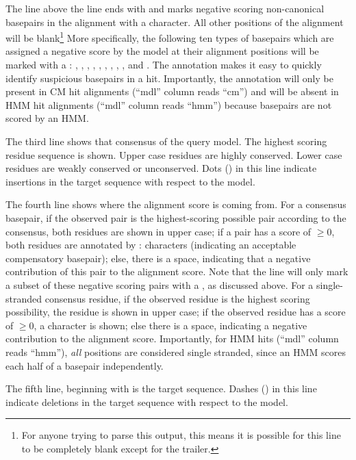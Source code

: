 The line above the  line ends with  and marks
negative scoring non-canonical basepairs in the alignment with a
 character. All other positions of the alignment will be
blank\footnote{For anyone trying to parse this output, this means it
is possible for this line to be completely blank except for the
 trailer.} More specifically, the following ten types of
basepairs which are assigned a negative score by the model at their
alignment positions will be marked with a : ,
, , , , ,
, , , and . The 
annotation makes it easy to quickly identify suspicious basepairs in
a hit. Importantly, the  annotation will only be present in
CM hit alignments (``mdl'' column reads ``cm'') and will be absent in
HMM hit alignments (``mdl'' column reads ``hmm'') because basepairs
are not scored by an HMM.

The third line shows that consensus of the query model. The highest
scoring residue sequence is shown. Upper case residues are highly
conserved. Lower case residues are weakly conserved or unconserved.
Dots () in this line indicate insertions in the target
sequence with respect to the model.

The fourth line shows where the alignment score is coming from. For a
consensus basepair, if the observed pair is the highest-scoring
possible pair according to the consensus, both residues are shown in
upper case; if a pair has a score of $\geq 0$, both residues are
annotated by : characters (indicating an acceptable compensatory
basepair); else, there is a space, indicating that a negative
contribution of this pair to the alignment score. Note that the 
 line will only mark a subset of these negative scoring
pairs with a , as discussed above.
For a single-stranded consensus residue, if the observed residue is
the highest scoring possibility, the residue is shown in upper case;
if the observed residue has a score of $\geq 0$, a \otext{+} character
is shown; else there is a space, indicating a negative contribution to
the alignment score. Importantly, for HMM hits (``mdl'' column reads
``hmm''), \emph{all} positions are considered single stranded, since
an HMM scores each half of a basepair independently.

The fifth line, beginning with  is
the target sequence. Dashes (\otext{-}) in this line indicate deletions
in the target sequence with respect to the model.

